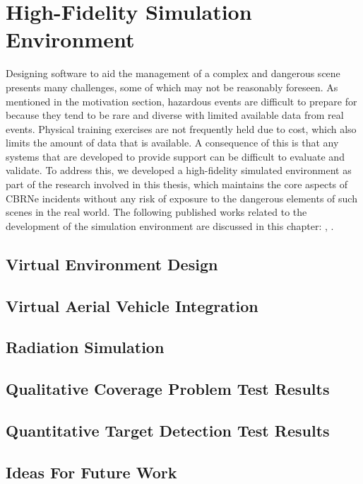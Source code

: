 \chapter{High-Fidelity Simulation Environment}
\workinprogress
Designing software to aid the management of a complex and dangerous scene presents many challenges, some of which may not be reasonably foreseen. As mentioned in the motivation section, hazardous events are difficult to prepare for because they tend to be rare and diverse with limited available data from real events. Physical training exercises are not frequently held due to cost, which also limits the amount of data that is available. A consequence of this is that any systems that are developed to provide support can be difficult to evaluate and validate. To address this, we developed a high-fidelity simulated environment as part of the research involved in this thesis, which maintains the core aspects of CBRNe incidents without any risk of exposure to the dangerous elements of such scenes in the real world. The following published works related to the development of the simulation environment are discussed in this chapter: \cite{Smyth2017AInvestigation}, \cite{GEMDavidSmyth}.\par


\section{Virtual Environment Design}


\section{Virtual Aerial Vehicle Integration}


\section{Radiation Simulation}

\section{Qualitative Coverage Problem Test Results}

\section{Quantitative Target Detection Test Results}

\section{Ideas For Future Work}